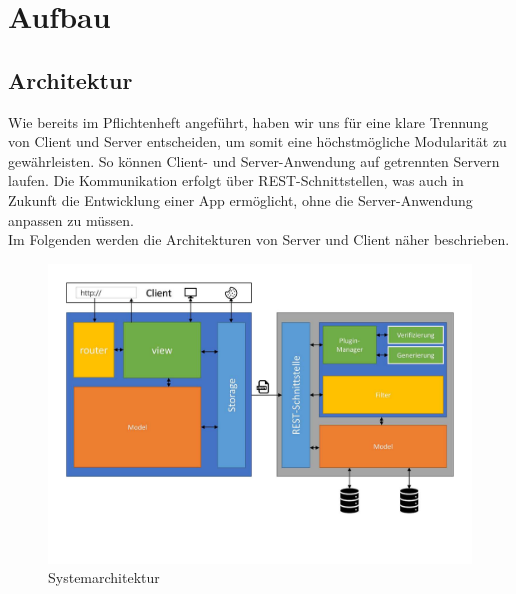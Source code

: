 \section{Aufbau}

\subsection{Architektur}
Wie bereits im Pflichtenheft angeführt, haben wir uns für eine klare Trennung von Client und Server entscheiden, um somit eine höchstmögliche Modularität zu gewährleisten. So können Client- und Server-Anwendung auf getrennten Servern laufen. Die Kommunikation erfolgt über REST-Schnittstellen, was auch in Zukunft die Entwicklung einer App ermöglicht, ohne die Server-Anwendung anpassen zu müssen. \\
Im Folgenden werden die Architekturen von Server und Client näher beschrieben.
\begin{figure}[h]
	\centering
	\includegraphics[width=.7\textwidth, clip, trim= {0cm 3cm 0cm 0cm}]{content/diagrams/architecture}
	\caption{Systemarchitektur}
\end{figure}
